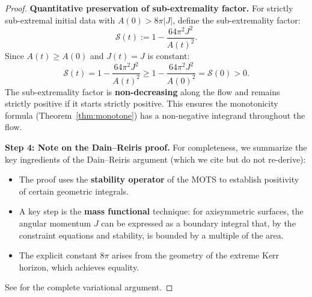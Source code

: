 \begin{proof}
\textbf{Quantitative preservation of sub-extremality factor.}
For strictly sub-extremal initial data with $A(0) > 8\pi|J|$, define the sub-extremality factor:
\[
\mathcal{S}(t) := 1 - \frac{64\pi^2 J^2}{A(t)^2}.
\]
Since $A(t) \geq A(0)$ and $J(t) = J$ is constant:
\[
\mathcal{S}(t) = 1 - \frac{64\pi^2 J^2}{A(t)^2} \geq 1 - \frac{64\pi^2 J^2}{A(0)^2} = \mathcal{S}(0) > 0.
\]
The sub-extremality factor is \textbf{non-decreasing} along the flow and remains strictly positive if it starts strictly positive. This ensures the monotonicity formula (Theorem~\ref{thm:monotone}) has a non-negative integrand throughout the flow.

\textbf{Step 4: Note on the Dain--Reiris proof.}
For completeness, we summarize the key ingredients of the Dain--Reiris argument (which we cite but do not re-derive):
\begin{itemize}
    \item The proof uses the \textbf{stability operator} of the MOTS to establish positivity of certain geometric integrals.
    \item A key step is the \textbf{mass functional} technique: for axisymmetric surfaces, the angular momentum $J$ can be expressed as a boundary integral that, by the constraint equations and stability, is bounded by a multiple of the area.
    \item The explicit constant $8\pi$ arises from the geometry of the extreme Kerr horizon, which achieves equality.
\end{itemize}
See \cite[Section 3]{dain2011} for the complete variational argument.
\end{proof}

